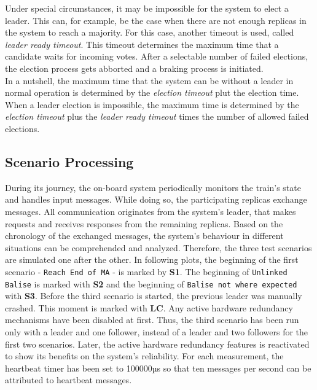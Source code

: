 Under special circumstances, it may be impossible for the system to elect a leader.
This can, for example, be the case when there are not enough replicas in the system to reach a majority.
For this case, another timeout is used, called \textit{leader ready timeout}.
This timeout determines the maximum time that a candidate waits for incoming votes.
After a selectable number of failed elections, the election process gets abborted and a braking process is initiated.
\\

In a nutshell, the maximum time that the system can be without a leader in normal operation is determined by the \textit{election timeout} plut the election time.
When a leader election is impossible, the maximum time is determined by the \textit{election timeout} plus the \textit{leader ready timeout} times the number of allowed failed elections.




\subsection{Scenario Processing}

During its journey, the on-board system periodically monitors the train's state and handles input messages.
While doing so, the participating replicas exchange messages.
All communication originates from the system's leader, that makes requests and receives responses from the remaining replicas.
Based on the chronology of the exchanged messages, the system's behaviour in different situations can be comprehended and analyzed.
Therefore, the three test scenarios are simulated one after the other.
In following plots, the beginning of the first scenario - \texttt{Reach End of MA} - is marked by \textbf{S1}.
The beginning of \texttt{Unlinked Balise} is marked with \textbf{S2} and the beginning of \texttt{Balise not where expected} with \textbf{S3}.
Before the third scenario is started, the previous leader was manually crashed.
This moment is marked with \textbf{LC}.
Any active hardware redundancy mechanisms have been disabled at first.
Thus, the third scenario has been run only with a leader and one follower, instead of a leader and two followers for the first two scenarios.
Later, the active hardware redundancy features is reactivated to show its benefits on the system's reliability.
For each measurement, the heartbeat timer has been set to 100000µs so that ten messages per second can be attributed to heartbeat messages.
\\

